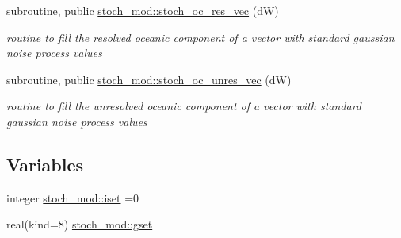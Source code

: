 \begin{DoxyCompactItemize}
subroutine, public \hyperlink{namespacestoch__mod_a5755bfeff5833b9a8bda92ec2d940f0b}{stoch\+\_\+mod\+::stoch\+\_\+oc\+\_\+res\+\_\+vec} (dW)
\begin{DoxyCompactList}\small\item\em routine to fill the resolved oceanic component of a vector with standard gaussian noise process values \end{DoxyCompactList}\item 
subroutine, public \hyperlink{namespacestoch__mod_a54d51f19303ab07c03b861022a4f149e}{stoch\+\_\+mod\+::stoch\+\_\+oc\+\_\+unres\+\_\+vec} (dW)
\begin{DoxyCompactList}\small\item\em routine to fill the unresolved oceanic component of a vector with standard gaussian noise process values \end{DoxyCompactList}\end{DoxyCompactItemize}
\subsection*{Variables}
\begin{DoxyCompactItemize}
\item 
integer \hyperlink{namespacestoch__mod_a266187af9a49e162926a5ef2d67e141a}{stoch\+\_\+mod\+::iset} =0
\item 
real(kind=8) \hyperlink{namespacestoch__mod_a15f89f8abf449fad0aea548852af1e60}{stoch\+\_\+mod\+::gset}
\end{DoxyCompactItemize}
